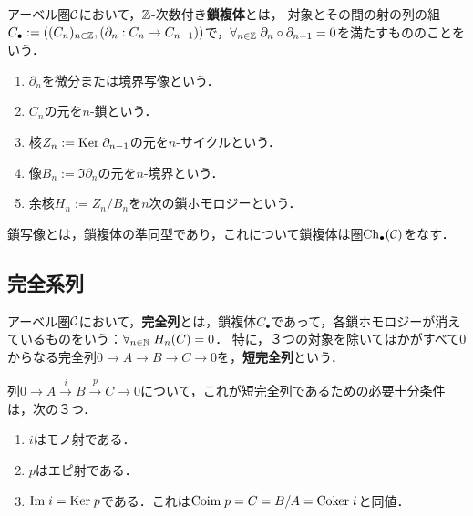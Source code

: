 \documentclass[uplatex,dvipdfmx]{jsreport}
\begin{document}
\begin{definition}
    アーベル圏$\mathcal{C}$において，$\mathbb{Z}$-次数付き\textbf{鎖複体}とは，
    対象とその間の射の列の組$C_\bullet:=((C_n)_{n\in\mathbb{Z}},(\partial_n:C_n\to C_{n-1}))$で，$\forall_{n\in\mathbb{Z}}\;\partial_n\circ\partial_{n+1}=0$を満たすもののことをいう．
    \begin{enumerate}
        \item $\partial_n$を微分または境界写像という．
        \item $C_n$の元を$n$-鎖という．
        \item 核$Z_n:=\mathrm{Ker}\;\partial_{n-1}$の元を$n$-サイクルという．
        \item 像$B_n:=\Im\partial_n$の元を$n$-境界という．
        \item 余核$H_n:=Z_n/B_n$を$n$次の鎖ホモロジーという．
    \end{enumerate}
\end{definition}

\begin{definition}
    鎖写像とは，鎖複体の準同型であり，これについて鎖複体は圏$\mathrm{Ch}_\bullet(\mathcal{C})$をなす．
\end{definition}

\subsection{完全系列}

\begin{definition}
    アーベル圏$\mathcal{C}$において，\textbf{完全列}とは，鎖複体$C_\bullet$であって，各鎖ホモロジーが消えているものをいう：$\forall_{n\in\mathbb{N}}\;H_n(C)=0$．
    特に，３つの対象を除いてほかがすべて$0$からなる完全列$0\to A\to B\to C\to 0$を，\textbf{短完全列}という．
\end{definition}

\begin{proposition}[短完全列であることの特徴付け]
    列$0\to A\xrightarrow{i}B\xrightarrow{p}C\to 0$について，これが短完全列であるための必要十分条件は，次の３つ．
    \begin{enumerate}
        \item $i$はモノ射である．
        \item $p$はエピ射である．
        \item $\mathrm{Im}\; i=\mathrm{Ker}\; p$である．これは$\mathrm{Coim}\; p=C=B/A=\mathrm{Coker}\; i$と同値．
    \end{enumerate}
\end{proposition}
\end{document}
